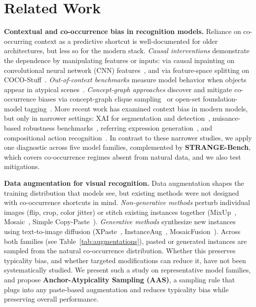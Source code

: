 \section{Related Work}

\noindent\textbf{Contextual and co-occurrence bias in recognition models.} Reliance on co-occurring context as a predictive shortcut is well-documented for older architectures, but less so for the modern stack. \emph{Causal interventions} demonstrate the dependence by manipulating features or inputs: via causal inpainting on convolutional neural network (CNN) features~\cite{shetty2019not}, and via feature-space splitting on COCO-Stuff~\cite{caesar2018coco,singh2020don}. 
\emph{Out-of-context benchmarks} measure model behavior when objects appear in atypical scenes~\cite{acharya2022detecting,bomatter2021pigs}. \emph{Concept-graph approaches} discover and mitigate co-occurrence biases via concept-graph clique sampling~\cite{chakraborty2024visual} or open-set foundation-model tagging~\cite{sarridis2025mavias}.
More recent work has examined context bias in modern models, but only in narrower settings: XAI for segmentation and detection~\cite{dreyer2023revealing}, nuisance-based robustness benchmarks~\cite{zhao2022ood}, referring expression generation~\cite{merlo2026cooco}, and compositional action recognition~\cite{ahn2026can}.
In contrast to these narrower studies, we apply one diagnostic across five model families, complemented by \textbf{STRANGE-Bench}, which covers co-occurrence regimes absent from natural data, and we also test mitigations.



\noindent\textbf{Data augmentation for visual recognition.} Data augmentation shapes the training distribution that models see, but existing methods were not designed with co-occurrence shortcuts in mind. \emph{Non-generative methods} perturb individual images (flip, crop, color jitter) or stitch existing instances together (MixUp~\cite{zhang2017mixup}, Mosaic~\cite{bochkovskiy2020yolov4}, Simple Copy-Paste~\cite{ghiasi2021simple}). \emph{Generative methods} synthesize new instances using text-to-image diffusion (XPaste~\cite{zhao2023x}, InstanceAug~\cite{kupyn2024dataset}, MosaicFusion~\cite{xie2025mosaicfusion}). Across both families (see Table~\ref{tab:augmentations}), pasted or generated instances are sampled from the natural co-occurrence distribution. Whether this preserves typicality bias, and whether targeted modifications can reduce it, have not been systematically studied. We present such a study on representative model families, and
propose \textbf{Anchor-Atypicality Sampling (AAS)}, a sampling rule that plugs into any paste-based augmentation and reduces typicality bias while preserving overall performance.

